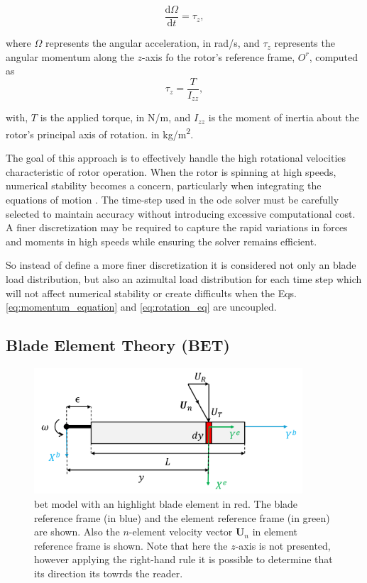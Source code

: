 \begin{equation}
    \frac{\mathrm{d}\Omega}{\mathrm{d}t} = \tau_z
    \label{eq:rotation_eq},
\end{equation}

\noindent where $\Omega$ represents the angular acceleration, in \unit{rad/s}, and $\tau_z$ represents the angular momentum along the $z$-axis fo the rotor's reference frame, $O^r$, computed as 
\begin{equation}
    \tau_z = \frac{T}{I_{zz}},
\end{equation}

\noindent with, $T$ is the applied torque, in \unit{N/m}, and $I_{zz}$ is the moment of inertia about the rotor’s principal axis of rotation. in \unit{kg/m^2}.

The goal of this approach is to effectively handle the high rotational velocities characteristic of rotor operation. When the rotor is spinning at high speeds, numerical stability becomes a concern, particularly when integrating the equations of motion \cite{arnold_numerical_2011,press_numerical_2007}. The time-step used in the \gls{ode} solver must be carefully selected to maintain accuracy without introducing excessive computational cost. A finer discretization may be required to capture the rapid variations in forces and moments in high speeds while ensuring the solver remains efficient.

So instead of define a more finer discretization it is considered not only an blade load distribution, but also an azimultal load distribution for each time step which will not affect numerical stability or create difficults when the Eqs. \ref{eq:momentum_equation} and \ref{eq:rotation_eq} are uncoupled.

\subsection{Blade Element Theory (BET)}
\label{section:bet}

\begin{figure}[!htb]
    \centering
    \includegraphics[width=10cm]{Figures/background/bet/blade.png}
    \caption{\gls{bet} model with an highlight blade element in red. The blade reference frame (in blue) and the element reference frame (in green) are shown. Also the $n$-element velocity vector $\mathbf{U}_n$ in element reference frame is shown. Note that here the $z$-axis is not presented, however applying the right-hand rule it is possible to determine that its direction its towrds the reader.}
    \label{fig:blade_bet}
\end{figure}

